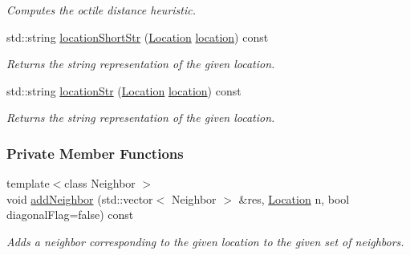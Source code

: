 \begin{DoxyCompactItemize}
\begin{DoxyCompactList}\small\item\em Computes the octile distance heuristic. \end{DoxyCompactList}\item 
std\+::string \hyperlink{structGridMap_ac5f56aba6a0a699c84529017a7814fcd}{location\+Short\+Str} (\hyperlink{structGridMap_ad3b51a1e56e84f0548a80ed647ea359c}{Location} \hyperlink{structGridMap_ae4ee97945ca450cf548848105c404584}{location}) const 
\begin{DoxyCompactList}\small\item\em Returns the string representation of the given location. \end{DoxyCompactList}\item 
std\+::string \hyperlink{structGridMap_a9b64431710ce3aed0c2986176233733e}{location\+Str} (\hyperlink{structGridMap_ad3b51a1e56e84f0548a80ed647ea359c}{Location} \hyperlink{structGridMap_ae4ee97945ca450cf548848105c404584}{location}) const 
\begin{DoxyCompactList}\small\item\em Returns the string representation of the given location. \end{DoxyCompactList}\end{DoxyCompactItemize}
\subsubsection*{Private Member Functions}
\begin{DoxyCompactItemize}
\item 
{\footnotesize template$<$class Neighbor $>$ }\\void \hyperlink{structGridMap_ab5484ae2e5db0376f4a1887d77a7cb60}{add\+Neighbor} (std\+::vector$<$ Neighbor $>$ \&res, \hyperlink{structGridMap_ad3b51a1e56e84f0548a80ed647ea359c}{Location} n, bool diagonal\+Flag=false) const 
\begin{DoxyCompactList}\small\item\em Adds a neighbor corresponding to the given location to the given set of neighbors. \end{DoxyCompactList}\end{DoxyCompactItemize}
